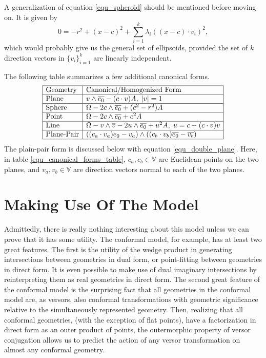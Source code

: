 \documentclass{birkjour}
\theoremstyle{definition}
\theoremstyle{remark}
\numberwithin{equation}{section}
\newcommand{\V}{\mathbb{V}}
\begin{document}
A generalization of equation \eqref{equ_spheroid} should be mentioned
before moving on.  It is given by
\begin{equation}
0 = -r^2 + (x-c)^2 + \sum_{i=1}^k \lambda_i((x-c)\cdot v_i)^2,
\end{equation}
which would probably give us the general set of ellipsoids, provided
the set of $k$ direction vectors in $\{v_i\}_{i=1}^k$ are
linearly independent.

The following table summarizes a few additional canonical forms.
\begin{equation}\label{equ_canonical_forms_table}
\begin{array}{|l|l|}
\hline
\mbox{Geometry} & \mbox{Canonical/Homogenized Form} \\
\hline
\mbox{Plane} & v\wedge\overline{e_0} - (c\cdot v)A,\;|v|=1 \\
\hline
\mbox{Sphere} & \Omega - 2c\wedge\overline{e_0} + (c^2-r^2)A \\
\hline
\mbox{Point} & \Omega - 2c\wedge\overline{e_0} + c^2A \\
\hline
\mbox{Line} & \Omega - v\wedge\overline{v} - 2u\wedge\overline{e_0} + u^2A,\;u=c-(c\cdot v)v \\
\hline
\mbox{Plane-Pair} & ((c_a\cdot v_a)e_0-v_a)\wedge((c_b\cdot v_b)\overline{e_0}-\overline{v_b}) \\
\hline
\end{array}
\end{equation}
The plain-pair form is discussed below with equation \eqref{equ_double_plane}.  Here,
in table \eqref{equ_canonical_forms_table}, $c_a,c_b\in\V$ are Euclidean points
on the two planes, and $v_a,v_b\in\V$ are direction vectors normal to each of the two planes.

\section{Making Use Of The Model}

Admittedly, there is really nothing interesting about this model unless we can
prove that it has some utility.  The conformal model, for example, has at least
two great features.  The first is the utility of the wedge product in generating
intersections between geometries in dual form, or point-fitting between
geometries in direct form.  It is even possible to
make use of dual imaginary intersections by reinterpreting them as real geometries
in direct form.  The second great feature of the conformal model is the
surprising fact that all geometries in the conformal model are, as versors, also conformal transformations
with geometric significance relative to the simultaneously represented geometry.
Then, realizing that all conformal geometries, (with the exception of flat points), have
a factorization in direct form as an outer product of points, the outermorphic
property of versor conjugation allows us to predict the action of any versor
transformation on almost any conformal geometry.
\end{document}

